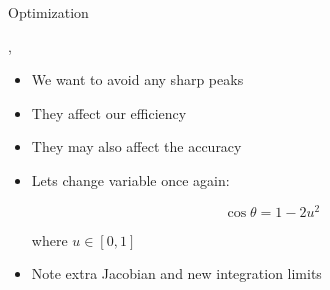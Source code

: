 \begin{slide}{Optimization}
\null\vfill

  \twocolumn
  {
    \sep
    \begin{itemize}
      \item We want to avoid any sharp peaks
      \item They affect our efficiency
      \item They may also affect the accuracy
      \item Lets change variable once again:
      
      $$\cos\theta = 1 - 2u^2$$
     
      where $u\in[0,1]$
      
      \item Note extra Jacobian and new integration limits
      
    \end{itemize}
  }
  {
    
    \vspace{-10pt}
    
  }
  
\vfill\null
\end{slide}
